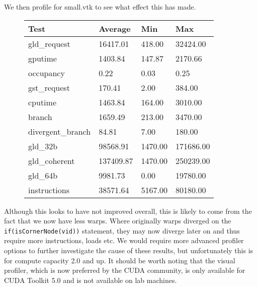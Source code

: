 We then profile for small.vtk to see what effect this has made.\\
\begin{figure}[H]\centering \begin{tabular}{ l | l | l | l}
\hline
Test & Average & Min & Max \\
\hline
\hline
gld\_request & 16417.01 & 418.00 & 32424.00 \\
gputime & 1403.84 & 147.87 & 2170.66 \\
occupancy & 0.22 & 0.03 & 0.25 \\
gst\_request & 170.41 & 2.00 & 384.00 \\
cputime & 1463.84 & 164.00 & 3010.00 \\
branch & 1659.49 & 213.00 & 3470.00 \\
divergent\_branch & 84.81 & 7.00 & 180.00 \\
gld\_32b & 98568.91 & 1470.00 & 171686.00 \\
gld\_coherent & 137409.87 & 1470.00 & 250239.00 \\
gld\_64b & 9981.73 & 0.00 & 19780.00 \\
instructions & 38571.64 & 5167.00 & 80180.00 \\
\hline
\end{tabular} \end{figure}

Although this looks to have not improved overall, this is likely to come from the fact that we now have less warps. Where originally warps diverged on the \verb!if(isCornerNode(vid))! statement, they may now diverge later on and thus require more instructions, loads etc.
We would require more advanced profiler options to further investigate the cause of these results, but unfortunately this is for compute capacity 2.0 and up. It should be worth noting that the visual profiler, which is now preferred by the CUDA community, is only available for CUDA Toolkit 5.0 and is not available on lab machines.